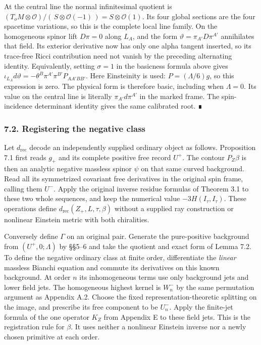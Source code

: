 \documentclass[
  english,
  11pt,
  reqno]{amsart}
\begin{document}
At the central line the normal infinitesimal quotient is
\((T_oM\otimes\mathcal O)/(\,S\otimes\mathcal O(-1)\,)
=S\otimes\mathcal O(1)\). Its four global sections are the four
spacetime variations, so this is the complete local line family. On the
homogeneous spinor lift \(D\pi=0\) along \(L_A\), and the form
\(\vartheta=\pi_{A'}D\pi^{A'}\) annihilates that field. Its exterior
derivative now has only one alpha tangent inserted, so its trace-free
Ricci contribution need not vanish by the preceding alternating
identity. Equivalently, setting \(\sigma=1\) in the basicness formula
above gives
\(\iota_{L_A}d\vartheta=-\theta^B\pi^{A'}\pi^{B'}P_{AA'BB'}\). Here
Einsteinity is used: \(P=(\Lambda/6)g\), so this expression is zero. The
physical form is therefore basic, including when \(\Lambda=0\). Its
value on the central line is literally \(\pi_{A'}d\pi^{A'}\) in the
marked frame. The spin-incidence determinant identity gives the same
calibrated root. ∎

\protect{}\label{sec:gg-negative-registration}

\subsubsection{7.2. Registering the negative
class}\label{registering-the-negative-class}

Let \(d_{\mathrm{rec}}\) decode an independently supplied ordinary
object as follows. Proposition 7.1 first reads \(g_+\) and its complete
positive free record \(U^+\). The contour \(P_Z\beta\) is then an
analytic negative massless spinor \(\psi\) on that same curved
background. Read all its symmetrized covariant free derivatives in the
original spin frame, calling them \(U^-\). Apply the original inverse
residue formulas of Theorem 3.1 to these two whole sequences, and keep
the numerical value \(-3H(I_\tau,I_\tau)\). These operations define
\(d_{\mathrm{rec}}(Z_+,L,\tau,\beta)\) without a supplied ray
construction or nonlinear Einstein metric with both chiralities.

Conversely define \(\Gamma\) on an original pair. Generate the
pure-positive background from \((U^+,0;\Lambda)\) by §§5--6 and take the
quotient and exact form of Lemma 7.2. To define the negative ordinary
class at finite order, differentiate the \emph{linear} massless Bianchi
equation and commute its derivatives on this known background. At order
\(n\) its inhomogeneous terms use only background jets and lower field
jets. The homogeneous highest kernel is \(W_n^-\) by the same
permutation argument as Appendix A.2. Choose the fixed
representation-theoretic splitting on the image, and prescribe its free
component to be \(U_n^-\). Apply the finite-jet formula of the one
operator \(K_Z\) from Appendix E to these field jets. This is the
registration rule for \(\beta\). It uses neither a nonlinear Einstein
inverse nor a newly chosen primitive at each order.
\end{document}
